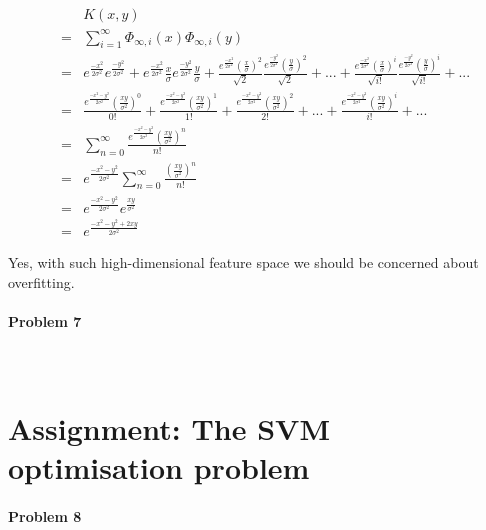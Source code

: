 \documentclass{article}
\begin{document}
\begin{eqnarray}
&&K(x,y)\\
&=& \sum_{i=1}^{\infty} \Phi_{\infty,i}(x) \Phi_{\infty,i}(y)\\
&=& e^{\frac{-x^2}{2\sigma^2}}e^{\frac{-y^2}{2\sigma^2}} + e^{\frac{-x^2}{2\sigma^2}}\frac{x}{\sigma}e^{\frac{-y^2}{2\sigma^2}}\frac{y}{\sigma} + \frac{e^{\frac{-x^2}{2\sigma^2}}\left(\frac{x}{\sigma}\right)^2}{\sqrt{2}}\frac{e^{\frac{-y^2}{2\sigma^2}}\left(\frac{y}{\sigma}\right)^2}{\sqrt{2}}+...+ \frac{e^{\frac{-x^2}{2\sigma^2}}\left(\frac{x}{\sigma}\right)^i}{\sqrt{i!}}\frac{e^{\frac{-y^2}{2\sigma^2}}\left(\frac{y}{\sigma}\right)^i}{\sqrt{i!}}+...\\
&=& \frac{e^{\frac{-x^2-y^2}{2\sigma^2}}\left( \frac{xy}{\sigma^2} \right)^0}{0!} + \frac{e^{\frac{-x^2-y^2}{2\sigma^2}}\left( \frac{xy}{\sigma^2} \right)^1}{1!} + \frac{e^{\frac{-x^2-y^2}{2\sigma^2}}\left( \frac{xy}{\sigma^2} \right)^2}{2!} + ... + \frac{e^{\frac{-x^2-y^2}{2\sigma^2}}\left( \frac{xy}{\sigma^2} \right)^i}{i!} + ...\\
&=& \sum_{n = 0}^{\infty} \frac{e^{\frac{-x^2-y^2}{2\sigma^2}}\left( \frac{xy}{\sigma^2} \right)^n}{n!}\\
&=& e^{\frac{-x^2-y^2}{2\sigma^2}} \sum_{n = 0}^{\infty} \frac{\left( \frac{xy}{\sigma^2} \right)^n}{n!}\\ 
&=& e^{\frac{-x^2-y^2}{2\sigma^2}} e^{\frac{xy}{\sigma^2}}\\
&=& e^{\frac{-x^2-y^2+2xy}{2\sigma^2}}
\end{eqnarray}

Yes, with such high-dimensional feature space we should be concerned about overfitting.

\paragraph*{Problem 7}
$\;$ 

\section{Assignment: The SVM optimisation problem}
\paragraph*{Problem 8}
$\;$ 
\end{document}
